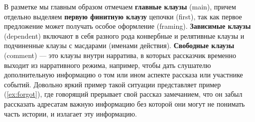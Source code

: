 \par В разметке мы главным образом отмечаем \textbf{главные клаузы} (main), причем отдельно выделяем \textbf{первую финитную клаузу} цепочки (first), так как первое предложение может получать особое оформление (framing). \textbf{Зависимые клаузы} (dependent) включают в себя разного рода конвербные и релятивные клаузы и подчиненные клаузы с масдарами (именами действия). \textbf{Свободные клаузы} (comment) --- это клаузы внутри нарратива, в которых рассказчик временно выходит из нарративного режима, например, чтобы дать слушателю дополнительную информацию о том или ином аспекте рассказа или участнике событий. Довольно яркий пример такой ситуации представляет пример (\ref{ex:forgot}), где говорящий прерывает свой рассказ замечанием, что он забыл рассказать адресатам важную информацию без которой они могут не понимать часть истории, и излагает эту информацию.


